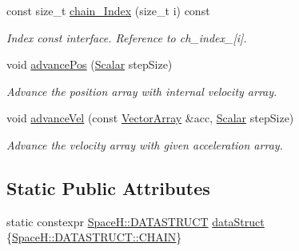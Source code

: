 \begin{DoxyCompactItemize}
const size\+\_\+t \mbox{\hyperlink{class_vel_indep_chain_particles_ad2cec742c8fa63849b9ff5b8876f879a}{chain_\+Index}} (size\+\_\+t i) const
\begin{DoxyCompactList}\small\item\em Index const interface. Reference to ch\+\_\+index\+\_\+\mbox{[}i\mbox{]}. \end{DoxyCompactList}\item 
void \mbox{\hyperlink{class_vel_indep_chain_particles_a76124f26a1e37892cd38f533edcbb8e8}{advance\+Pos}} (\mbox{\hyperlink{class_vel_indep_particles_a5d275b22f0d759f360ddd80e78f4b466}{Scalar}} step\+Size)
\begin{DoxyCompactList}\small\item\em Advance the position array with internal velocity array. \end{DoxyCompactList}\item 
void \mbox{\hyperlink{class_vel_indep_chain_particles_aa09b6bf7f9efbe1da4de3d106581b3a6}{advance\+Vel}} (const \mbox{\hyperlink{class_vel_indep_particles_a27580f65b6523bfb6900520af2e44708}{Vector\+Array}} \&acc, \mbox{\hyperlink{class_vel_indep_particles_a5d275b22f0d759f360ddd80e78f4b466}{Scalar}} step\+Size)
\begin{DoxyCompactList}\small\item\em Advance the velocity array with given acceleration array. \end{DoxyCompactList}\end{DoxyCompactItemize}
\subsection*{Static Public Attributes}
\begin{DoxyCompactItemize}
\item 
static constexpr \mbox{\hyperlink{namespace_space_h_a4782f089179a3c269891f02482b072df}{Space\+H\+::\+D\+A\+T\+A\+S\+T\+R\+U\+CT}} \mbox{\hyperlink{class_vel_indep_chain_particles_a58396033a881431db18207bf280892ea}{data\+Struct}} \{\mbox{\hyperlink{namespace_space_h_a0af19f79a6498e99dbda772053d44a72a014d2cf3cdc3af6f4f92c09190860e33}{Space\+H\+::\+D\+A\+T\+A\+S\+T\+R\+U\+C\+T\+::\+C\+H\+A\+IN}}\}
\end{DoxyCompactItemize}
